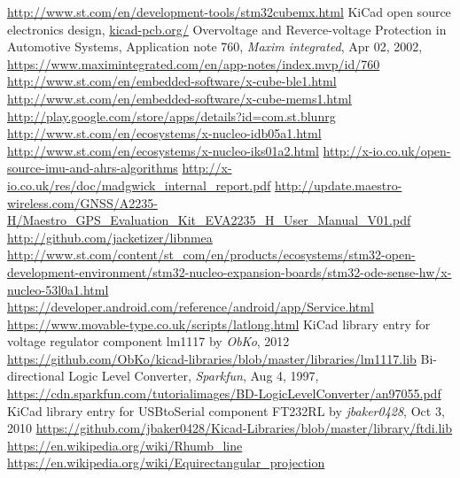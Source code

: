 \begin{thebibliography}{9}
\label{sec:ref}


  \url{http://www.st.com/en/development-tools/stm32cubemx.html}
  KiCad open source electronics design,
  \url{kicad-pcb.org/}
	Overvoltage and Reverce-voltage Protection in Automotive Systems,
	Application note 760, \emph{Maxim integrated}, Apr 02, 2002, 
	\url{https://www.maximintegrated.com/en/app-notes/index.mvp/id/760}
  \url{http://www.st.com/en/embedded-software/x-cube-ble1.html}
  \url{http://www.st.com/en/embedded-software/x-cube-mems1.html}
  \url{http://play.google.com/store/apps/details?id=com.st.blunrg}
  \url{http://www.st.com/en/ecosystems/x-nucleo-idb05a1.html}
  \url{http://www.st.com/en/ecosystems/x-nucleo-iks01a2.html}
  \url{http://x-io.co.uk/open-source-imu-and-ahrs-algorithms}
  \url{http://x-io.co.uk/res/doc/madgwick_internal_report.pdf}
  \url{http://update.maestro-wireless.com/GNSS/A2235-H/Maestro_GPS_Evaluation_Kit_EVA2235_H_User_Manual_V01.pdf}
  \url{http://github.com/jacketizer/libnmea}
  \url{http://www.st.com/content/st_com/en/products/ecosystems/stm32-open-development-environment/stm32-nucleo-expansion-boards/stm32-ode-sense-hw/x-nucleo-53l0a1.html}
  \url{https://developer.android.com/reference/android/app/Service.html}
  \url{https://www.movable-type.co.uk/scripts/latlong.html}
	KiCad library entry for voltage regulator component lm1117 by \emph{ObKo}, 2012  
  \url{https://github.com/ObKo/kicad-libraries/blob/master/libraries/lm1117.lib}
	Bi-directional Logic Level Converter, \emph{Sparkfun}, Aug 4, 1997,
	\url{https://cdn.sparkfun.com/tutorialimages/BD-LogicLevelConverter/an97055.pdf}
	KiCad library entry for USBtoSerial component FT232RL by \emph{jbaker0428}, Oct 3, 2010
	\url{https://github.com/jbaker0428/Kicad-Libraries/blob/master/library/ftdi.lib}
  \url{https://en.wikipedia.org/wiki/Rhumb_line}
  \url{https://en.wikipedia.org/wiki/Equirectangular_projection}

\end{thebibliography}
